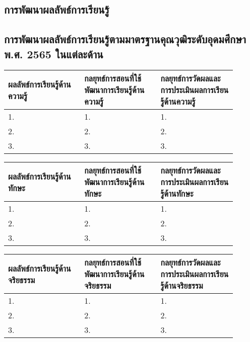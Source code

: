  \newpage
 \begin{landscape}
 \section{การพัฒนาผลลัพธ์การเรียนรู้}
 \subsection{การพัฒนาผลลัพธ์การเรียนรู้ตามมาตรฐานคุณวุฒิระดับอุดมศึกษา พ.ศ. 2565 ในแต่ละด้าน}
 
 \par\noindent\bigskip
 \renewcommand{\arraystretch}{1.3}
 \begin{tabular}{|p{0.3\linewidth}|p{0.3\linewidth}|p{0.3\linewidth}|}
\hline
\textbf{ผลลัพธ์การเรียนรู้ด้านความรู้} & \textbf{กลยุทธ์การสอนที่ใช้พัฒนาการเรียนรู้ด้านความรู้} & \textbf{กลยุทธ์การวัดผลและการประเมินผลการเรียนรู้ด้านความรู้} \\
\hline 
1. & 1. & 1. \\ \hline
2. & 2. & 2. \\ \hline
3. & 3. & 3. \\ \hline
 \end{tabular}
 
 \par\noindent\bigskip
 \renewcommand{\arraystretch}{1.3}
 \begin{tabular}{|p{0.3\linewidth}|p{0.3\linewidth}|p{0.3\linewidth}|}
\hline
\textbf{ผลลัพธ์การเรียนรู้ด้านทักษะ} & \textbf{กลยุทธ์การสอนที่ใช้พัฒนาการเรียนรู้ด้านทักษะ} & \textbf{กลยุทธ์การวัดผลและการประเมินผลการเรียนรู้ด้านทักษะ} \\
\hline 
1. & 1. & 1. \\ \hline
2. & 2. & 2. \\ \hline
3. & 3. & 3. \\ \hline
 \end{tabular}
 
 
 \par\noindent\bigskip
 \renewcommand{\arraystretch}{1.3}
 \begin{tabular}{|p{0.3\linewidth}|p{0.3\linewidth}|p{0.3\linewidth}|}
\hline
\textbf{ผลลัพธ์การเรียนรู้ด้านจริยธรรม} & \textbf{กลยุทธ์การสอนที่ใช้พัฒนาการเรียนรู้ด้านจริยธรรม} & \textbf{กลยุทธ์การวัดผลและการประเมินผลการเรียนรู้ด้านจริยธรรม} \\
\hline 
1. & 1. & 1. \\ \hline
2. & 2. & 2. \\ \hline
3. & 3. & 3. \\ \hline
 \end{tabular}
 

\end{landscape}
